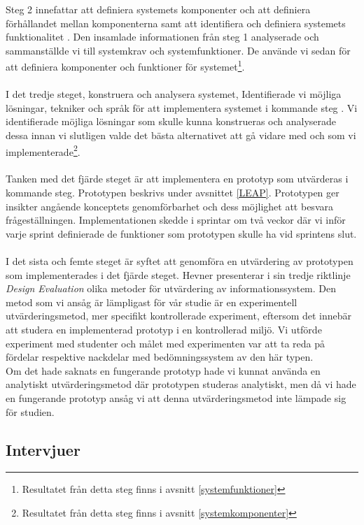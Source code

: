 \documentclass[a4paper,11pt]{article}
\begin{document}
{Steg 2 innefattar att definiera systemets komponenter och att definiera förhållandet mellan komponenterna samt att identifiera och definiera systemets funktionalitet \cite{nunamaker}. Den insamlade informationen från steg 1 analyserade och sammanställde vi till systemkrav och systemfunktioner. De använde vi sedan för att definiera komponenter och funktioner för systemet\footnote{Resultatet från detta steg finns i avsnitt \ref{systemfunktioner}}.
\\
\\
I det tredje steget, konstruera och analysera systemet, Identifierade vi möjliga lösningar, tekniker och språk för att implementera systemet i kommande steg \cite{nunamaker}. Vi identifierade möjliga lösningar som skulle kunna konstrueras och analyserade dessa innan vi slutligen valde det bästa alternativet att gå vidare med och som vi implementerade\footnote{Resultatet från detta steg finns i avsnitt \ref{systemkomponenter}}.
\\
\\
Tanken med det fjärde steget är att implementera en prototyp som utvärderas i kommande steg. Prototypen beskrivs under avsnittet \ref{LEAP}. Prototypen ger insikter angående konceptets genomförbarhet och dess möjlighet att besvara frågeställningen. Implementationen skedde i sprintar om två veckor där vi inför varje sprint definierade de funktioner som prototypen skulle ha vid sprintens slut.
\\
\\
I det sista och femte steget är syftet att genomföra en utvärdering av prototypen som implementerades i det fjärde steget. Hevner \cite{hevner} presenterar i sin tredje riktlinje \textit{Design Evaluation} olika metoder för utvärdering av informationssystem. Den metod som vi ansåg är lämpligast för vår studie är en experimentell utvärderingsmetod, mer specifikt kontrollerade experiment, eftersom det innebär att studera en implementerad prototyp i en kontrollerad miljö. Vi utförde experiment med studenter och målet med experimenten var att ta reda på fördelar respektive nackdelar med bedömningssystem av den här typen. 
\\
Om det hade saknats en fungerande prototyp hade vi kunnat använda en analytiskt utvärderingsmetod där prototypen studeras analytiskt, men då vi hade en fungerande prototyp ansåg vi att denna utvärderingsmetod inte lämpade sig för studien.

\subsection{Intervjuer}\label{Intervjuer}

}
\end{document}
